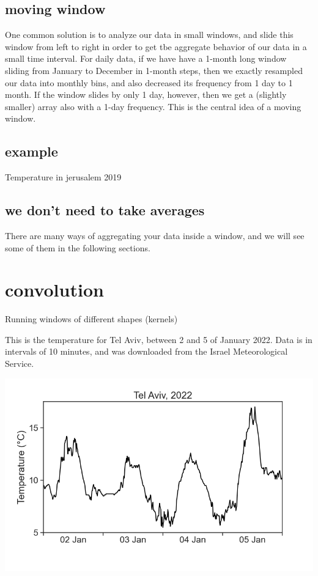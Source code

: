\documentclass[
  letterpaper,
  DIV=11,
  numbers=noendperiod,
  oneside]{scrreprt}
\begin{document}
\hypertarget{moving-window}{%
\section{moving window}\label{moving-window}}

One common solution is to analyze our data in small windows, and slide
this window from left to right in order to get tbe aggregate behavior of
our data in a small time interval. For daily data, if we have have a
1-month long window sliding from January to December in 1-month steps,
then we exactly resampled our data into monthly bins, and also decreased
its frequency from 1 day to 1 month. If the window slides by only 1 day,
however, then we get a (slightly smaller) array also with a 1-day
frequency. This is the central idea of a moving window.

\hypertarget{example}{%
\section{example}\label{example}}

Temperature in jerusalem 2019

\hypertarget{we-dont-need-to-take-averages}{%
\section{we don't need to take
averages}\label{we-dont-need-to-take-averages}}

There are many ways of aggregating your data inside a window, and we
will see some of them in the following sections.

\hypertarget{convolution}{%
\chapter{convolution}\label{convolution}}

Running windows of different shapes (kernels)

\hfill\break

This is the temperature for Tel Aviv, between 2 and 5 of January 2022.
Data is in intervals of 10 minutes, and was downloaded from the Israel
Meteorological Service.

\includegraphics{smoothing/convolution_TA_temperature_2022.png}
\end{document}
